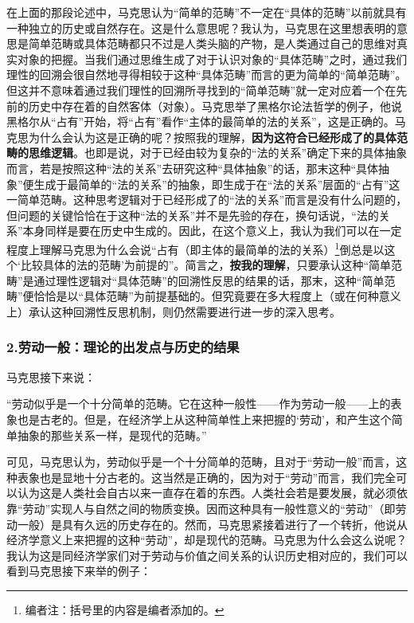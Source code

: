 \documentclass[a4paper,twoside,12pt,AutoFakeBold]{ctexart}
\begin{document}
在上面的那段论述中，马克思认为“简单的范畴”不一定在“具体的范畴”以前就具有一种独立的历史或自然存在。这是什么意思呢？我认为，马克思在这里想表明的意思是简单范畴或具体范畴都只不过是人类头脑的产物，是人类通过自己的思维对真实对象的把握。当我们通过思维生成了对于认识对象的“具体范畴”之时，通过我们理性的回溯会很自然地寻得相较于这种“具体范畴”而言的更为简单的“简单范畴”。但这并不意味着通过我们理性的回溯所寻找到的“简单范畴”就一定对应着一个在先前的历史中存在着的自然客体（对象）。马克思举了黑格尔论法哲学的例子，他说黑格尔从“占有”开始，将“占有”看作“主体的最简单的法的关系”，这是正确的。马克思为什么会认为这是正确的呢？按照我的理解，\textbf{因为这符合已经形成了的具体范畴的思维逻辑}。也即是说，对于已经由较为复杂的“法的关系”确定下来的具体抽象而言，若是按照这种“法的关系”去研究这种“具体抽象”的话，那末这种“具体抽象”便生成于最简单的“法的关系”的抽象，即生成于在“法的关系”层面的“占有”这一简单范畴。这种思考逻辑对于已经形成了的“法的关系”而言是没有什么问题的，但问题的关键恰恰在于这种“法的关系”并不是先验的存在，换句话说，“法的关系”本身同样是要在历史中生成的。因此，在这个意义上，我认为我们可以在一定程度上理解马克思为什么会说“占有（即主体的最简单的法的关系）\footnote{编者注：括号里的内容是编者添加的。}倒总是以这个‘比较具体的法的范畴’为前提的”。简言之，\textbf{按我的理解}，只要承认这种“简单范畴”是通过理性逻辑对“具体范畴”的回溯性反思的结果的话，那末，这种“简单范畴”便恰恰是以“具体范畴”为前提基础的。但究竟要在多大程度上（或在何种意义上）承认这种回溯性反思机制，则仍然需要进行进一步的深入思考。

\subsubsection{2.劳动一般：理论的出发点与历史的结果}
马克思接下来说：
\begin{adjustwidth}{2em}{2em}
    \qquad\fangsong
 “劳动似乎是一个十分简单的范畴。它在这种一般性——作为劳动一般——上的表象也是古老的。但是，在经济学上从这种简单性上来把握的‘劳动’，和产生这个简单抽象的那些关系一样，是现代的范畴。”
\end{adjustwidth}

可见，马克思认为，劳动似乎是一个十分简单的范畴，且对于“劳动一般”而言，这种表象也是显地十分古老的。这当然是正确的，因为对于“劳动”而言，我们完全可以认为这是人类社会自古以来一直存在着的东西。人类社会若是要发展，就必须依靠“劳动”实现人与自然之间的物质变换。因而这种具有一般性意义的“劳动”（即劳动一般）是具有久远的历史存在的。然而，马克思紧接着进行了一个转折，他说从经济学意义上来把握的这种“劳动”，却是现代的范畴。马克思为什么会这么说呢？我认为这是同经济学家们对于劳动与价值之间关系的认识历史相对应的，我们可以看到马克思接下来举的例子：
\end{document}
